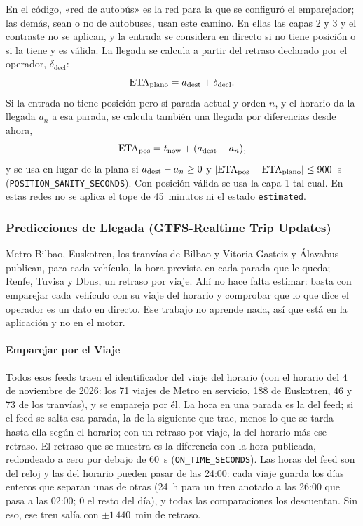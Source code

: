 En el código, «red de autobús» es la red para la que se configuró el emparejador; las demás, sean o no de autobuses,
usan este camino. En ellas las capas 2 y 3 y el contraste no se aplican, y la entrada se considera en directo si no tiene
posición o si la tiene y es válida. La llegada se calcula a partir del retraso declarado por el operador, $\delta_{\mathrm{decl}}$:
\begin{equation}
\mathrm{ETA}_{\mathrm{plano}}=a_{\mathrm{dest}}+\delta_{\mathrm{decl}}.
\end{equation}
Si la entrada no tiene posición pero sí parada actual y orden $n$, y el horario da la llegada $a_n$ a esa parada, se
calcula también una llegada por diferencias desde ahora,
\[
\mathrm{ETA}_{\mathrm{pos}}=t_{\mathrm{now}}+(a_{\mathrm{dest}}-a_n),
\]
y se usa en lugar de la plana si $a_{\mathrm{dest}}-a_n\ge0$ y $|\mathrm{ETA}_{\mathrm{pos}}-\mathrm{ETA}_{\mathrm{plano}}|\le900$~s
(\texttt{POSITION\_SANITY\_SECONDS}). Con posición válida se usa la capa 1 tal cual. En estas redes no se aplica el
tope de 45~minutos ni el estado \texttt{estimated}.

\subsubsection*{Predicciones de Llegada (GTFS-Realtime Trip Updates)}

Metro Bilbao, Euskotren, los tranvías de Bilbao y Vitoria-Gasteiz y Álavabus publican, para cada vehículo, la hora
prevista en cada parada que le queda; Renfe, Tuvisa y Dbus, un retraso por viaje. Ahí no hace falta estimar: basta con
emparejar cada vehículo con su viaje del horario y comprobar que lo que dice el operador es un dato en directo. Ese
trabajo no aprende nada, así que está en la aplicación y no en el motor.

\paragraph{Emparejar por el Viaje} Todos esos feeds traen el identificador del viaje del horario (con el horario del
4 de noviembre de 2026: los 71 viajes de Metro en servicio, 188 de Euskotren, 46 y 73 de los tranvías), y se empareja
por él. La hora en una parada es la del feed; si el feed se salta esa parada, la de la siguiente que trae, menos lo que
se tarda hasta ella según el horario; con un retraso por viaje, la del horario más ese retraso. El retraso que se
muestra es la diferencia con la hora publicada, redondeado a cero por debajo de 60~s (\texttt{ON\_TIME\_SECONDS}).
Las horas del feed son del reloj y las del horario pueden pasar de las 24:00: cada viaje guarda los días enteros que
separan unas de otras (24~h para un tren anotado a las 26:00 que pasa a las 02:00; 0 el resto del día), y todas las
comparaciones los descuentan. Sin eso, ese tren salía con $\pm1\,440$~min de retraso.

